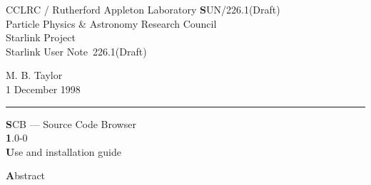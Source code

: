 \documentclass[twoside,11pt]{article}
\newcommand{\stardoccategory}  {Starlink User Note}
\newcommand{\stardocinitials}  {SUN}
\newcommand{\stardocnumber}    {226.1(Draft)}
\newcommand{\stardocauthors}   {M. B. Taylor}
\newcommand{\stardocdate}      {1 December 1998}
\newcommand{\stardoctitle}     {SCB --- Source Code Browser}
\newcommand{\stardocversion}   {1.0-0}
\newcommand{\stardocmanual}    {Use and installation guide}
\newcommand{\stardocname}{\stardocinitials /\stardocnumber}
\newenvironment{latexonly}{}{}
\renewcommand{\_}{\texttt{\symbol{95}}}
\begin{document}
\thispagestyle{empty}

\begin{latexonly}
   CCLRC / {\textsc Rutherford Appleton Laboratory} \hfill {\textbf \stardocname}\\
   {\large Particle Physics \& Astronomy Research Council}\\
   {\large Starlink Project\\}
   {\large \stardoccategory\ \stardocnumber}
   \begin{flushright}
   \stardocauthors\\
   \stardocdate
   \end{flushright}
   \vspace{-4mm}
   \rule{\textwidth}{0.5mm}
   \vspace{5mm}
   \begin{center}
   {\Huge\textbf  \stardoctitle \\ [2.5ex]}
   {\LARGE\textbf \stardocversion \\ [4ex]}
   {\Huge\textbf  \stardocmanual}
   \end{center}
   \vspace{5mm}


   \vspace{10mm}
   \begin{center}
      {\Large\textbf Abstract}
   \end{center}
\end{latexonly}
\end{document}

